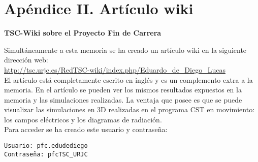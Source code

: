 \chapter*{\textbf{Apéndice II. Artículo wiki}}

\begin{Large}
    \textbf{TSC-Wiki sobre el Proyecto Fin de Carrera}
\end{Large}

Simultáneamente a esta memoria se ha creado un artículo wiki en la siguiente dirección web:\\

\url{http://tsc.urjc.es/RedTSC-wiki/index.php/Eduardo_de_Diego_Lucas}\\

El artículo está completamente escrito en inglés y es un complemento extra a la memoria. En el artículo se pueden ver los mismos resultados expuestos en la memoria y las simulaciones realizadas. La ventaja que posee es que se puede visualizar las simulaciones en 3D realizadas en el programa CST en movimiento: los campos eléctricos y los diagramas de radiación.\\

Para acceder se ha creado este usuario y contraseña:

\begin{center}
    \texttt{Usuario: pfc.edudediego}\\
    \texttt{Contraseña: pfcTSC\_URJC}
\end{center}
